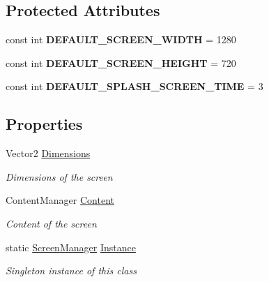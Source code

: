 \subsection*{Protected Attributes}
\begin{DoxyCompactItemize}
\item 
\hypertarget{class_hel_project_1_1_u_i_1_1_screen_manager_a6135e97988ecb7b97fc2c0e3e950d406}{}const int {\bfseries D\+E\+F\+A\+U\+L\+T\+\_\+\+S\+C\+R\+E\+E\+N\+\_\+\+W\+I\+D\+T\+H} = 1280\label{class_hel_project_1_1_u_i_1_1_screen_manager_a6135e97988ecb7b97fc2c0e3e950d406}

\item 
\hypertarget{class_hel_project_1_1_u_i_1_1_screen_manager_ae5d532987a0f23f1ffd79da7ee442014}{}const int {\bfseries D\+E\+F\+A\+U\+L\+T\+\_\+\+S\+C\+R\+E\+E\+N\+\_\+\+H\+E\+I\+G\+H\+T} = 720\label{class_hel_project_1_1_u_i_1_1_screen_manager_ae5d532987a0f23f1ffd79da7ee442014}

\item 
\hypertarget{class_hel_project_1_1_u_i_1_1_screen_manager_af7b676812b28083a4de9a910e70f3e7b}{}const int {\bfseries D\+E\+F\+A\+U\+L\+T\+\_\+\+S\+P\+L\+A\+S\+H\+\_\+\+S\+C\+R\+E\+E\+N\+\_\+\+T\+I\+M\+E} = 3\label{class_hel_project_1_1_u_i_1_1_screen_manager_af7b676812b28083a4de9a910e70f3e7b}

\end{DoxyCompactItemize}
\subsection*{Properties}
\begin{DoxyCompactItemize}
\item 
Vector2 \hyperlink{class_hel_project_1_1_u_i_1_1_screen_manager_abb86f242ecaa5f540e91701af01696de}{Dimensions}
\begin{DoxyCompactList}\small\item\em Dimensions of the screen \end{DoxyCompactList}\item 
Content\+Manager \hyperlink{class_hel_project_1_1_u_i_1_1_screen_manager_a0e0ac0e0475a6a7fa4e21c2c413a7bcc}{Content}
\begin{DoxyCompactList}\small\item\em Content of the screen \end{DoxyCompactList}\item 
static \hyperlink{class_hel_project_1_1_u_i_1_1_screen_manager}{Screen\+Manager} \hyperlink{class_hel_project_1_1_u_i_1_1_screen_manager_acf1138ad8b8146a517d7b5288e3792de}{Instance}
\begin{DoxyCompactList}\small\item\em Singleton instance of this class \end{DoxyCompactList}\end{DoxyCompactItemize}


